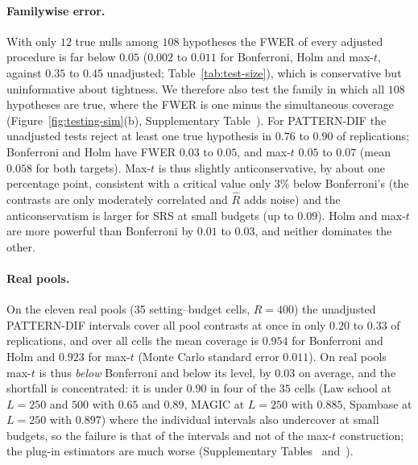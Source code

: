 \begin{table}[t]
\centering\footnotesize
\caption{PATTERN-DIF, synthetic population, $R=1000$ pools per row. Size: rejection rate of the two-sided Wald test of the true value at nominal $0.05$ (pool-conditional test of the pool contrast; two-phase test of the population contrast), mean and maximum over the $108$ contrasts (the maximum of a calibrated test has mean $0.068$). $\varpi$: median estimated $V_{\rm pool}/V_{\rm design}$. FWER: probability of rejecting at least one of the $12$ true nulls of $H_k:\theta_k=0$, $k=1,\dots,108$, at familywise level $0.05$ (population target).}\label{tab:test-size}
\resizebox{\textwidth}{!}{}
\end{table}

\paragraph{Familywise error.} With only $12$ true nulls among $108$ hypotheses the FWER of every adjusted procedure is far below $0.05$ ($0.002$ to $0.011$ for Bonferroni, Holm and max-$t$, against $0.35$ to $0.45$ unadjusted; Table~\ref{tab:test-size}), which is conservative but uninformative about tightness. We therefore also test the family in which all $108$ hypotheses are true, where the FWER is one minus the simultaneous coverage (Figure~\ref{fig:testing-sim}(b), Supplementary Table~). For PATTERN-DIF the unadjusted tests reject at least one true hypothesis in $0.76$ to $0.90$ of replications; Bonferroni and Holm have FWER $0.03$ to $0.05$, and max-$t$ $0.05$ to $0.07$ (mean $0.058$ for both targets). Max-$t$ is thus slightly anticonservative, by about one percentage point, consistent with a critical value only $3\%$ below Bonferroni's (the contrasts are only moderately correlated and $\hat R$ adds noise) and the anticonservatism is larger for SRS at small budgets (up to $0.09$). Holm and max-$t$ are more powerful than Bonferroni by $0.01$ to $0.03$, and neither dominates the other.

\paragraph{Real pools.} On the eleven real pools (35 setting--budget cells, $R=400$) the unadjusted PATTERN-DIF intervals cover all pool contrasts at once in only $0.20$ to $0.33$ of replications, and over all cells the mean coverage is $0.954$ for Bonferroni and Holm and $0.923$ for max-$t$ (Monte Carlo standard error $0.011$). On real pools max-$t$ is thus \emph{below} Bonferroni and below its level, by $0.03$ on average, and the shortfall is concentrated: it is under $0.90$ in four of the $35$ cells (Law school at $L=250$ and $500$ with $0.65$ and $0.89$, MAGIC at $L=250$ with $0.885$, Spambase at $L=250$ with $0.897$) where the individual intervals also undercover at small budgets, so the failure is that of the intervals and not of the max-$t$ construction; the plug-in estimators are much worse (Supplementary Tables~ and~).

